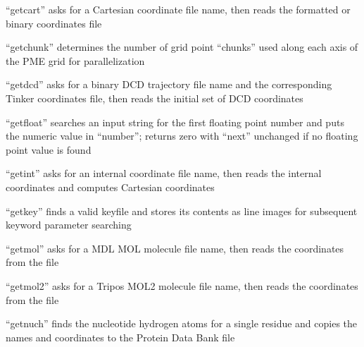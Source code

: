 \documentclass[letterpaper,11pt,english]{sphinxmanual}
\begin{document}
\sphinxAtStartPar
{}

\sphinxAtStartPar
“getcart” asks for a Cartesian coordinate file name, then reads the formatted or binary coordinates file

\sphinxAtStartPar
{}

\sphinxAtStartPar
“getchunk” determines the number of grid point “chunks” used along each axis of the PME grid for parallelization

\sphinxAtStartPar
{}

\sphinxAtStartPar
“getdcd” asks for a binary DCD trajectory file name and the corresponding Tinker coordinates file, then reads the initial set of DCD coordinates

\sphinxAtStartPar
{}

\sphinxAtStartPar
“getfloat” searches an input string for the first floating point number and puts the numeric value in “number”; returns zero with “next” unchanged if no floating point value is found

\sphinxAtStartPar
{}

\sphinxAtStartPar
“getint” asks for an internal coordinate file name, then reads the internal coordinates and computes Cartesian coordinates

\sphinxAtStartPar
{}

\sphinxAtStartPar
“getkey” finds a valid keyfile and stores its contents as line images for subsequent keyword parameter searching

\sphinxAtStartPar
{}

\sphinxAtStartPar
“getmol” asks for a MDL MOL molecule file name, then reads the coordinates from the file

\sphinxAtStartPar
{}

\sphinxAtStartPar
“getmol2” asks for a Tripos MOL2 molecule file name, then reads the coordinates from the file

\sphinxAtStartPar
{}

\sphinxAtStartPar
{}

\sphinxAtStartPar
“getnuch” finds the nucleotide hydrogen atoms for a single residue and copies the names and coordinates to the Protein Data Bank file
\end{document}
